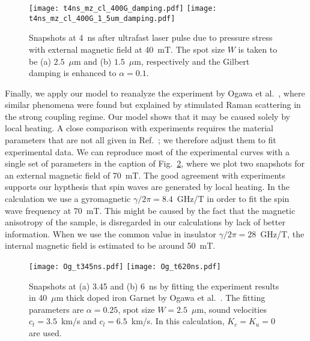\documentclass[aps,prb,twocolumn,superscriptaddress,floatfix]{revtex4}%
\begin{document}
\begin{figure}[ptb]
\texttt{[image: t4ns\_mz\_cl\_400G\_damping.pdf]}
\texttt{[image: t4ns\_mz\_cl\_400G\_1\_5um\_damping.pdf]}
\caption{Snapshots at 4~ns after ultrafast laser pulse due to pressure stress with external magnetic field at 40~mT. The spot size $W$ is taken to be (a) $2.5$~$\mu$m and (b) $1.5$~$\mu$m, respectively and the Gilbert damping is enhanced to $\alpha=0.1$.}%
\label{damping}%
\end{figure}

Finally, we apply our model to reanalyze the experiment by Ogawa et al.~\cite{Ogawa15}, where similar phenomena were found but explained by stimulated Raman scattering in the strong coupling regime. Our model shows that it may be caused solely by local heating. A close comparison with experiments requires the material parameters that are not all given in Ref.~\cite{Ogawa15}; we therefore adjust them to fit experimental data. We can reproduce most of the experimental curves with a single set of parameters in the caption of  Fig.~\ref{2Dfigure}, where we plot two snapshots for an external magnetic field of 70~mT. The good agreement with experiments supports our hypthesis that spin waves are generated by local heating. In the calculation we use a gyromagnetic $\gamma/2\pi=8.4$~GHz/T in order to fit the spin wave frequency at 70~mT. This might be caused by the fact that the magnetic anisotropy of the sample, is disregarded in our calculations by lack of better information. When we use the common value in insulator $\gamma/2\pi=28$~GHz/T, the internal magnetic field is estimated to be around 50~mT.


\begin{figure}[ptb]
\texttt{[image: Og\_t345ns.pdf]}
\texttt{[image: Og\_t620ns.pdf]}
\caption{Snapshots at (a) 3.45 and (b) 6~ns by fitting the experiment results in 40~$\mu$m thick doped iron Garnet by Ogawa et al.~\cite{Ogawa15}. The fitting parameters are $\alpha=0.25$, spot size $W=2.5$~$\mu$m, sound velocities $c_t=3.5$~km/s and $c_l=6.5$~km/s. In this calculation, $K_c=K_u=0$ are used.}%
\label{2Dfigure}%
\end{figure}
\end{document}
